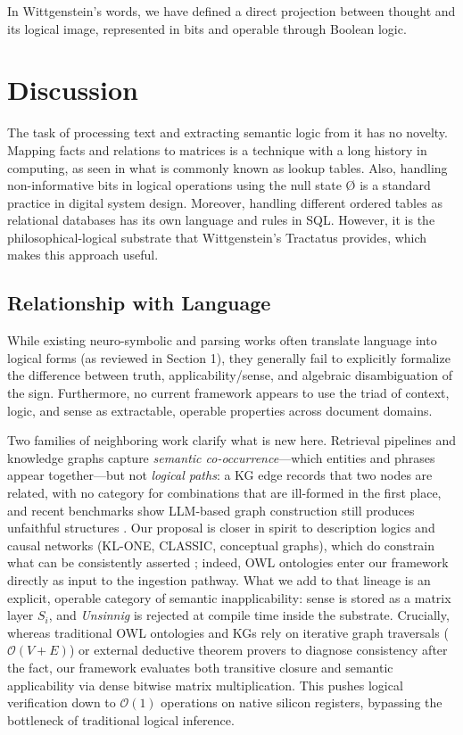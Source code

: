 \documentclass{article}
\begin{document}
In Wittgenstein's words, we have defined a direct projection between
thought and its logical image, represented in bits and operable through
Boolean logic.

\hypertarget{discussion}{%
\section{Discussion}\label{discussion}}

The task of processing text and extracting semantic logic from it has no
novelty. Mapping facts and relations to matrices is a technique with a
long history in computing, as seen in what is commonly known as lookup
tables. Also, handling non-informative bits in logical operations using
the null state Ø is a standard practice in digital system design.
Moreover, handling different ordered tables as relational databases has
its own language and rules in SQL. However, it is the
philosophical-logical substrate that Wittgenstein's Tractatus provides,
which makes this approach useful.

\hypertarget{relationship-with-language}{%
\subsection{Relationship with
Language}\label{relationship-with-language}}

While existing neuro-symbolic and parsing works often translate language
into logical forms (as reviewed in Section 1), they generally fail to
explicitly formalize the difference between truth, applicability/sense,
and algebraic disambiguation of the sign. Furthermore, no current
framework appears to use the triad of context, logic, and sense as
extractable, operable properties across document domains.

Two families of neighboring work clarify what is new here. Retrieval
pipelines and knowledge graphs capture \emph{semantic
co-occurrence}---which entities and phrases appear together---but not
\emph{logical paths}: a KG edge records that two nodes are related, with
no category for combinations that are ill-formed in the first place, and
recent benchmarks show LLM-based graph construction still produces
unfaithful structures \citep{sansford2024grapheval}. Our proposal is
closer in spirit to description logics and causal networks (KL-ONE,
CLASSIC, conceptual graphs), which do constrain what can be consistently
asserted \citep{brachman1990, lehmann1992, sowa1991, kruse2022causal};
indeed, OWL ontologies enter our framework directly as input to the
ingestion pathway. What we add to that lineage is an explicit, operable
category of semantic inapplicability: sense is stored as a matrix layer
\(S_i\), and \emph{Unsinnig} is rejected at compile time inside the
substrate. Crucially, whereas traditional OWL ontologies and KGs rely on
iterative graph traversals (\(\mathcal{O}(V+E)\)) or external deductive
theorem provers to diagnose consistency after the fact, our framework
evaluates both transitive closure and semantic applicability via dense
bitwise matrix multiplication. This pushes logical verification down to
\(\mathcal{O}(1)\) operations on native silicon registers, bypassing the
bottleneck of traditional logical inference.
\end{document}
